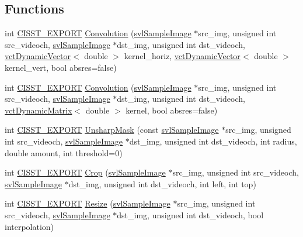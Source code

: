 \subsection*{Functions}
\begin{DoxyCompactItemize}
\item 
int \hyperlink{cmn_export_macros_8h_a99393e0c3ac434b2605235bbe20684f8}{C\-I\-S\-S\-T\-\_\-\-E\-X\-P\-O\-R\-T} \hyperlink{namespacesvl_image_processing_afec459e2a0098f55c4bbf6046eb3aaa1}{Convolution} (\hyperlink{classsvl_sample_image}{svl\-Sample\-Image} $\ast$src\-\_\-img, unsigned int src\-\_\-videoch, \hyperlink{classsvl_sample_image}{svl\-Sample\-Image} $\ast$dst\-\_\-img, unsigned int dst\-\_\-videoch, \hyperlink{classvct_dynamic_vector}{vct\-Dynamic\-Vector}$<$ double $>$ kernel\-\_\-horiz, \hyperlink{classvct_dynamic_vector}{vct\-Dynamic\-Vector}$<$ double $>$ kernel\-\_\-vert, bool absres=false)
\item 
int \hyperlink{cmn_export_macros_8h_a99393e0c3ac434b2605235bbe20684f8}{C\-I\-S\-S\-T\-\_\-\-E\-X\-P\-O\-R\-T} \hyperlink{namespacesvl_image_processing_a880dbed3ab656ceaa85d30c1a21e4e22}{Convolution} (\hyperlink{classsvl_sample_image}{svl\-Sample\-Image} $\ast$src\-\_\-img, unsigned int src\-\_\-videoch, \hyperlink{classsvl_sample_image}{svl\-Sample\-Image} $\ast$dst\-\_\-img, unsigned int dst\-\_\-videoch, \hyperlink{classvct_dynamic_matrix}{vct\-Dynamic\-Matrix}$<$ double $>$ kernel, bool absres=false)
\item 
int \hyperlink{cmn_export_macros_8h_a99393e0c3ac434b2605235bbe20684f8}{C\-I\-S\-S\-T\-\_\-\-E\-X\-P\-O\-R\-T} \hyperlink{namespacesvl_image_processing_a80042923e0363cf08cb045b22d5a94f9}{Unsharp\-Mask} (const \hyperlink{classsvl_sample_image}{svl\-Sample\-Image} $\ast$src\-\_\-img, unsigned int src\-\_\-videoch, \hyperlink{classsvl_sample_image}{svl\-Sample\-Image} $\ast$dst\-\_\-img, unsigned int dst\-\_\-videoch, int radius, double amount, int threshold=0)
\item 
int \hyperlink{cmn_export_macros_8h_a99393e0c3ac434b2605235bbe20684f8}{C\-I\-S\-S\-T\-\_\-\-E\-X\-P\-O\-R\-T} \hyperlink{namespacesvl_image_processing_a1c84cbebcb082d646b0e304ac23042f3}{Crop} (\hyperlink{classsvl_sample_image}{svl\-Sample\-Image} $\ast$src\-\_\-img, unsigned int src\-\_\-videoch, \hyperlink{classsvl_sample_image}{svl\-Sample\-Image} $\ast$dst\-\_\-img, unsigned int dst\-\_\-videoch, int left, int top)
\item 
int \hyperlink{cmn_export_macros_8h_a99393e0c3ac434b2605235bbe20684f8}{C\-I\-S\-S\-T\-\_\-\-E\-X\-P\-O\-R\-T} \hyperlink{namespacesvl_image_processing_ad12f45ec4313ca217249da5793a0e9da}{Resize} (\hyperlink{classsvl_sample_image}{svl\-Sample\-Image} $\ast$src\-\_\-img, unsigned int src\-\_\-videoch, \hyperlink{classsvl_sample_image}{svl\-Sample\-Image} $\ast$dst\-\_\-img, unsigned int dst\-\_\-videoch, bool interpolation)

\end{DoxyCompactItemize}
